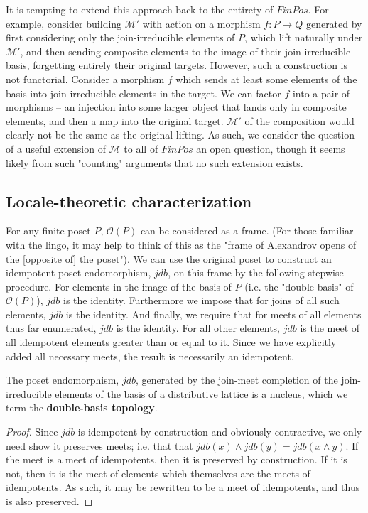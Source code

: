 \documentclass[hoptionsi,review,format=sigplan]{acmart}
\theoremstyle{definition}
\newcommand{\Mcc}{\mathcal{M}}
\newcommand{\Oc}{\mathcal{O}}
\begin{document}

It is tempting to extend this approach back to the entirety of \(FinPos\). For example, consider building \(\Mcc'\)  with action on a morphism \(f : P \rightarrow Q\) generated by first considering only the join-irreducible elements of \(P\), which lift naturally under \(\Mcc'\), and then sending composite elements to the image of their join-irreducible basis, forgetting entirely their original targets. However, such a construction is not functorial. Consider a morphism \(f\) which sends at least some  elements of the basis into join-irreducible elements in the target. We can factor \(f\) into a pair of morphisms -- an injection into some larger object that lands only in composite elements, and then a map into the original target. \(\Mcc'\) of the composition would clearly not be the same as the original lifting. As such, we consider the question of a useful extension of \(\Mcc\) to all of \(FinPos\) an open question, though it seems likely from such "counting" arguments that no such extension exists.

\subsection{Locale-theoretic characterization}

For any finite poset \(P\), \(\Oc(P)\) can be considered as a frame. (For those familiar with the lingo, it may help to think of this as the "frame of Alexandrov opens of the [opposite of] the poset"). We can use the original poset to construct an idempotent poset endomorphism, \(jdb\), on this frame by the following stepwise procedure. For elements in the image of the basis of \(P\) (i.e. the "double-basis" of \(\Oc(P)\)), \(jdb\) is the identity. Furthermore we impose that for joins of all such elements, \(jdb\) is the identity. And finally, we require that for meets of all elements thus far enumerated, \(jdb\) is the identity. For all other elements, \(jdb\) is the meet of all idempotent elements greater than or equal to it. Since we have explicitly added all necessary meets, the result is necessarily an idempotent.

\begin{lemma}
The poset endomorphism, \(jdb\), generated by the join-meet completion of the join-irreducible elements of the basis of a distributive lattice is a nucleus, which we term the \textbf{double-basis topology}.
\end{lemma}
\begin{proof}
Since \(jdb\) is idempotent by construction and obviously contractive, we only need show it preserves meets; i.e. that that \(jdb(x) \wedge jdb(y) = jdb(x  \wedge  y)\).  If the meet is a meet of idempotents, then it is preserved by construction. If it is not, then it is the meet of elements which themselves are the meets of idempotents. As such, it may be rewritten to be a meet of idempotents, and thus is also preserved.
\end{proof}
\end{document}
